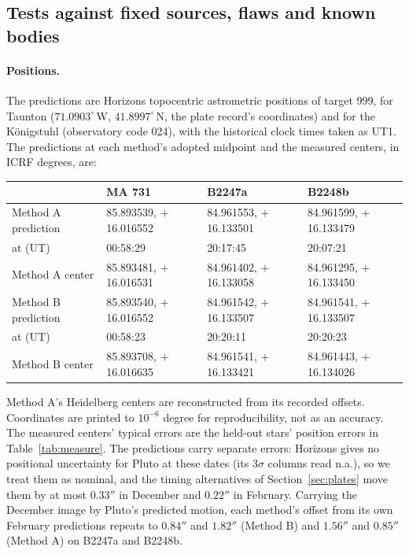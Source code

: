 \documentclass[11pt]{article}
\begin{document}
\begin{appendices}
\section{Tests against fixed sources, flaws and known bodies}
\label{app:tests}

\paragraph{Positions.} The predictions are Horizons topocentric astrometric positions of target 999, for Taunton ($71.0903^\circ$\,W, $41.8997^\circ$\,N, the plate record's coordinates) and for the Königstuhl (observatory code 024), with the historical clock times taken as UT1. The predictions at each method's adopted midpoint and the measured centers, in ICRF degrees, are:

\begin{center}
\footnotesize
\begin{tabular}{@{}llll@{}}
\toprule
 & MA 731 & B2247a & B2248b \\
\midrule
Method A prediction & 85.893539, $+$16.016552 & 84.961553, $+$16.133501 & 84.961599, $+$16.133479 \\
\quad at (UT) & 00:58:29 & 20:17:45 & 20:07:21 \\
Method A center & 85.893481, $+$16.016531 & 84.961402, $+$16.133058 & 84.961295, $+$16.133450 \\
\midrule
Method B prediction & 85.893540, $+$16.016552 & 84.961542, $+$16.133507 & 84.961541, $+$16.133507 \\
\quad at (UT) & 00:58:23 & 20:20:11 & 20:20:23 \\
Method B center & 85.893708, $+$16.016635 & 84.961541, $+$16.133421 & 84.961443, $+$16.134026 \\
\bottomrule
\end{tabular}
\end{center}
Method A's Heidelberg centers are reconstructed from its recorded offsets. Coordinates are printed to $10^{-6}$ degree for reproducibility, not as an accuracy. The measured centers' typical errors are the held-out stars' position errors in Table~\ref{tab:measure}. The predictions carry separate errors: Horizons gives no positional uncertainty for Pluto at these dates (its $3\sigma$ columns read n.a.), so we treat them as nominal, and the timing alternatives of Section~\ref{sec:plates} move them by at most $0.33''$ in December and $0.22''$ in February. Carrying the December image by Pluto's predicted motion, each method's offset from its own February predictions repeats to $0.84''$ and $1.82''$ (Method B) and $1.56''$ and $0.85''$ (Method A) on B2247a and B2248b.


\end{appendices}
\end{document}
